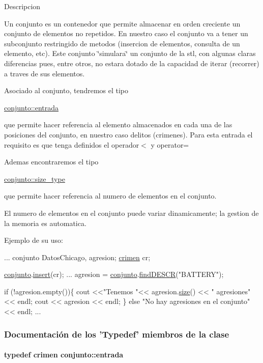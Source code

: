 Descripcion

Un conjunto es un contenedor que permite almacenar en orden creciente un conjunto de elementos no repetidos. En nuestro caso el conjunto va a tener un subconjunto restringido de metodos (insercion de elementos, consulta de un elemento, etc). Este conjunto \char`\"{}simulara\char`\"{} un conjunto de la stl, con algunas claras diferencias pues, entre otros, no estara dotado de la capacidad de iterar (recorrer) a traves de sus elementos.

Asociado al conjunto, tendremos el tipo
\begin{DoxyCode}
\hyperlink{classcrimen}{conjunto::entrada} 
\end{DoxyCode}
 que permite hacer referencia al elemento almacenados en cada una de las posiciones del conjunto, en nuestro caso delitos (crimenes). Para esta entrada el requisito es que tenga definidos el operador$<$ y operator=

Ademas encontraremos el tipo
\begin{DoxyCode}
\hyperlink{classconjunto_a855a5893bb0f5a851ab2dbf2b8aa6cc7}{conjunto::size\_type} 
\end{DoxyCode}
 que permite hacer referencia al numero de elementos en el conjunto.

El numero de elementos en el conjunto puede variar dinamicamente; la gestion de la memoria es automatica.

Ejemplo de su uso\-: 
\begin{DoxyCode}
...
conjunto DatosChicago, agresion;
\hyperlink{classcrimen}{crimen} cr;

\hyperlink{classconjunto}{conjunto}.\hyperlink{classconjunto_aa65b9f7c4cb9bad6d4e40c1973095930}{insert}(cr);
...
agresion = \hyperlink{classconjunto}{conjunto}.\hyperlink{classconjunto_afff3e7f4b3d00f422dd7ab2fec935378}{findDESCR}(\textcolor{stringliteral}{"BATTERY"});

\textcolor{keywordflow}{if} (!agresion.empty())\{
 cout <<\textcolor{stringliteral}{"Tenemos "}<< agresion.\hyperlink{classconjunto_a863e1e106e35adda47e7c5e2067295b9}{size}() << \textcolor{stringliteral}{" agresiones"} << endl;
 cout << agresion << endl;
\} \textcolor{keywordflow}{else} \textcolor{stringliteral}{"No hay agresiones en el conjunto"} << endl;
...
\end{DoxyCode}
 

\subsubsection{Documentación de los 'Typedef' miembros de la clase}
\hypertarget{classconjunto_a09cad766dd65de73e51eae21f9d22585}{
\paragraph[{entrada}]{\setlength{\rightskip}{0pt plus 5cm}typedef {\bf crimen} {\bf conjunto\-::entrada}}}\label{classconjunto_a09cad766dd65de73e51eae21f9d22585}


